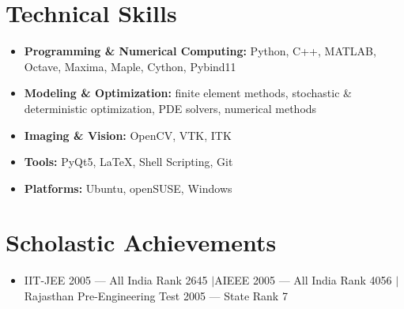 \documentclass[10.5pt,a4paper]{article}
\newenvironment{tightitemize}
  {\begin{itemize}[leftmargin=1.2em,itemsep=1pt,topsep=2pt,parsep=0pt]}
  {\end{itemize}}
\begin{document}
\section{Technical Skills}
\begin{tightitemize}
\item \textbf{Programming \& Numerical Computing:} Python, C++, MATLAB, Octave, Maxima, Maple, Cython, Pybind11
\item \textbf{Modeling \& Optimization:} finite element methods, stochastic \& deterministic optimization, PDE solvers, numerical methods
\item \textbf{Imaging \& Vision:} OpenCV, VTK, ITK
\item \textbf{Tools:} PyQt5, LaTeX, Shell Scripting, Git
\item \textbf{Platforms:} Ubuntu, openSUSE, Windows
\end{tightitemize}

\section{Scholastic Achievements}
\begin{tightitemize}
\item IIT-JEE 2005 --- All India Rank 2645 \quad$\vert$\quad AIEEE 2005 --- All India Rank 4056 \quad$\vert$\quad Rajasthan Pre-Engineering Test 2005 --- State Rank 7
\end{tightitemize}
\end{document}
